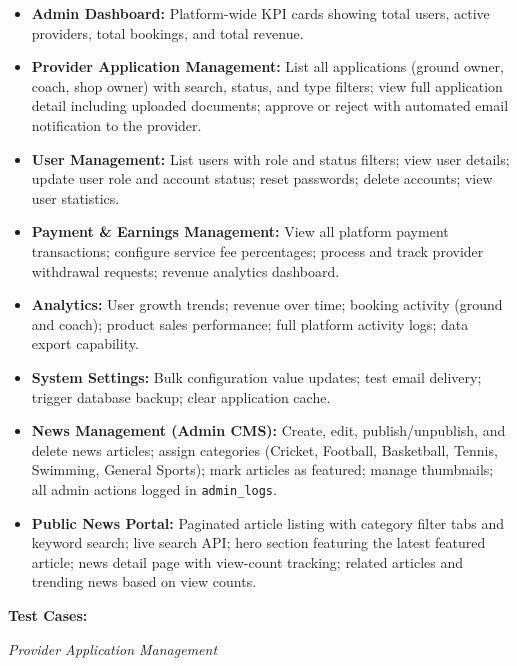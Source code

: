 \documentclass[12pt,a4paper]{report}
\begin{document}
\begin{itemize}[leftmargin=1.5cm]
  \item \textbf{Admin Dashboard:} Platform-wide KPI cards showing total users, active providers, total bookings, and total revenue.
  \item \textbf{Provider Application Management:} List all applications (ground owner, coach, shop owner) with search, status, and type filters; view full application detail including uploaded documents; approve or reject with automated email notification to the provider.
  \item \textbf{User Management:} List users with role and status filters; view user details; update user role and account status; reset passwords; delete accounts; view user statistics.
  \item \textbf{Payment \& Earnings Management:} View all platform payment transactions; configure service fee percentages; process and track provider withdrawal requests; revenue analytics dashboard.
  \item \textbf{Analytics:} User growth trends; revenue over time; booking activity (ground and coach); product sales performance; full platform activity logs; data export capability.
  \item \textbf{System Settings:} Bulk configuration value updates; test email delivery; trigger database backup; clear application cache.
  \item \textbf{News Management (Admin CMS):} Create, edit, publish/unpublish, and delete news articles; assign categories (Cricket, Football, Basketball, Tennis, Swimming, General Sports); mark articles as featured; manage thumbnails; all admin actions logged in \texttt{admin\_logs}.
  \item \textbf{Public News Portal:} Paginated article listing with category filter tabs and keyword search; live search API; hero section featuring the latest featured article; news detail page with view-count tracking; related articles and trending news based on view counts.
\end{itemize}

\textbf{Test Cases:}

\textit{Provider Application Management}
\end{document}

